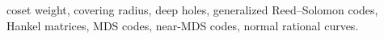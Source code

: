 coset weight, covering radius, deep holes, generalized Reed--Solomon codes,
Hankel matrices, MDS codes, near-MDS codes, normal rational curves.
